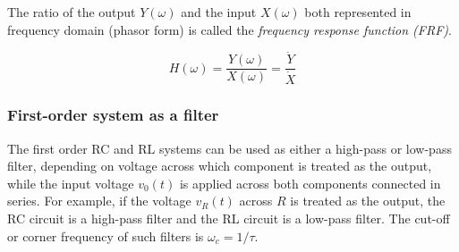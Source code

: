 \documentclass{article}
\begin{document}
The ratio of the output $Y(\omega)$ and the input $X(\omega)$ both represented
in frequency domain (phasor form) is called the {\em frequency response function 
(FRF)}. 

\begin{equation}
  H(\omega)=\frac{Y(\omega)}{X(\omega)}=\frac{\dot{Y}}{\dot{X}}
\end{equation}

\subsubsection*{First-order system as a filter}

The first order RC and RL systems can be used as either a high-pass or
low-pass filter, depending on voltage across which component is treated
as the output, while the input voltage $v_0(t)$ is applied across both 
components connected in series. For example, if the voltage $v_R(t)$ 
across $R$ is treated as the output, the RC circuit is a high-pass filter 
and the RL circuit is a low-pass filter. The cut-off or corner frequency 
of such filters is $\omega_c=1/\tau$.
\end{document}
